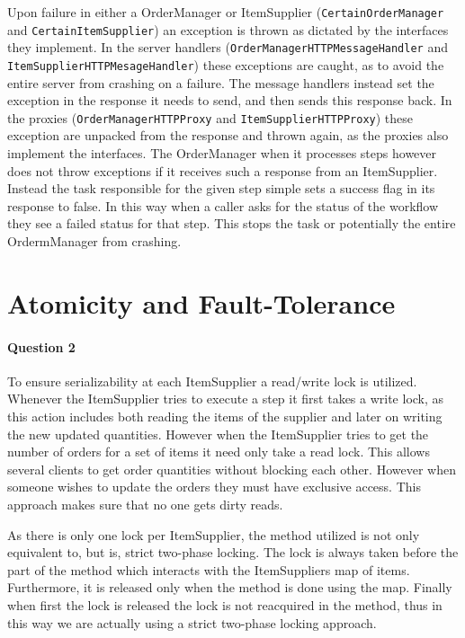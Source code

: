 \documentclass[a4paper, 11pt]{article}
\begin{document}
Upon failure in either a OrderManager or ItemSupplier (\texttt{CertainOrder\-Manager} and \texttt{CertainItemSupplier}) an exception is thrown as dictated by the interfaces they implement. In the server handlers (\texttt{Order\-ManagerHTTPMessageHandler} and \texttt{ItemSupplierHTTPMesageHandler}) these exceptions are caught, as to avoid the entire server from crashing on a failure. The message handlers instead set the exception in the response it needs to send, and then sends this response back. In the proxies (\texttt{OrderManagerHTTPProxy} and \texttt{ItemSupplierHTTPProxy}) these exception are unpacked from the response and thrown again, as the proxies also implement the interfaces. The OrderManager when it processes steps however does not throw exceptions if it receives such a response from an ItemSupplier. Instead the task responsible for the given step simple sets a success flag in its response to false. In this way when a caller asks for the status of the workflow they see a failed status for that step. This stops the task or potentially the entire OrdermManager from crashing.



\section{Atomicity and Fault-Tolerance} %
\label{sec:atomicity_and_fault_tolerance}

\paragraph{Question 2} %
\label{par:question_2}

To ensure serializability at each ItemSupplier a read/write lock is utilized. Whenever the ItemSupplier tries to execute a step it first takes a write lock, as this action includes both reading the items of the supplier and later on writing the new updated quantities. However when the ItemSupplier tries to get the number of orders for a set of items it need only take a read lock. This allows several clients to get order quantities without blocking each other. However when someone wishes to update the orders they must have exclusive access. This approach makes sure that no one gets dirty reads.

As there is only one lock per ItemSupplier, the method utilized is not only equivalent to, but is, strict two-phase locking. The lock is always taken before the part of the method which interacts with the ItemSuppliers map of items. Furthermore, it is released only when the method is done using the map. Finally when first the lock is released the lock is not reacquired in the method, thus in this way we are actually using a strict two-phase locking approach.
\end{document}
